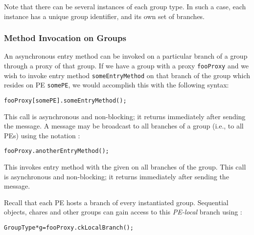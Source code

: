 
Note that there can be several instances of each group type.
In such a case, each instance has a unique group identifier, and its own set
of branches.

\subsubsection{Method Invocation on Groups}

An asynchronous entry method can be invoked on a particular branch of a
group through a proxy of that group. If we have a group with a proxy
{\tt fooProxy} and we wish to invoke entry method {\tt someEntryMethod} on
that branch of the group which resides on PE {\tt somePE}, we would accomplish
this with the following syntax:

\begin{alltt}
 fooProxy[somePE].someEntryMethod();
\end{alltt}

This call is asynchronous and non-blocking; it returns immediately after sending the message.
A message may be broadcast  to all branches of a group
(i.e., to all PEs) using the notation :

\begin{alltt}
 fooProxy.anotherEntryMethod();
\end{alltt}

This invokes entry method  with the given  on 
all branches of the group. This call is asynchronous and non-blocking; it returns immediately
after sending the message.

Recall that each PE hosts a branch of every instantiated group. 
Sequential objects, chares and other groups can gain access to this {\em PE-local}
branch using :

\begin{alltt}
GroupType *g=fooProxy.ckLocalBranch();
\end{alltt}

